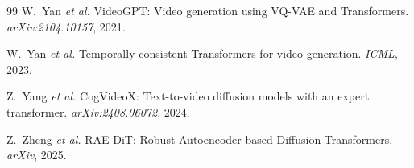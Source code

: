 \documentclass{article}
\begin{document}
\begin{thebibliography}{99}
W.~Yan \textit{et al.}
\newblock VideoGPT: Video generation using VQ-VAE and Transformers.
\newblock \textit{arXiv:2104.10157}, 2021.

W.~Yan \textit{et al.}
\newblock Temporally consistent Transformers for video generation.
\newblock \textit{ICML}, 2023.

Z.~Yang \textit{et al.}
\newblock CogVideoX: Text-to-video diffusion models with an expert transformer.
\newblock \textit{arXiv:2408.06072}, 2024.

Z.~Zheng \textit{et al.}
\newblock RAE-DiT: Robust Autoencoder-based Diffusion Transformers.
\newblock \textit{arXiv}, 2025.

\end{thebibliography}
\end{document}
